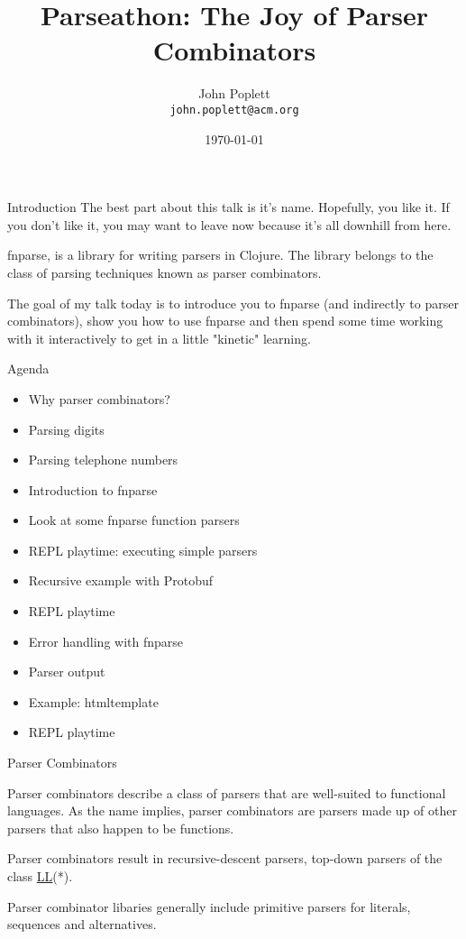 \documentclass[presentation]{beamer}
\begin{document}
\title{Parseathon: The Joy of Parser Combinators}
\author{John Poplett\\
  \texttt{john.poplett@acm.org}}
\date{\today}

\begin{frame}[plain]
\titlepage
\end{frame}

\begin{frame}{Introduction}
 The best part about this talk is it's name. Hopefully, you like it. If
you don't like it, you may want to leave now because it's all downhill
from here.

fnparse, is a library for writing parsers in Clojure. The library
belongs to the class of parsing techniques known as parser combinators.

The goal of my talk today is to introduce you to fnparse (and
indirectly to parser combinators), show you how to use fnparse and
then spend some time working with it interactively to get in a little
"kinetic" learning.
\end{frame}

\begin{frame}{Agenda}

\begin{itemize}
\item Why parser combinators?
\item Parsing digits
\item Parsing telephone numbers
\item Introduction to fnparse
\item Look at some fnparse function parsers
\item REPL playtime: executing simple parsers
\item Recursive example with Protobuf
\item REPL playtime
\item Error handling with fnparse
\item Parser output
\item Example: htmltemplate
\item REPL playtime
\end{itemize}

\end{frame}

\begin{frame}{Parser Combinators}

  Parser combinators describe a class of parsers that are well-suited
  to functional languages. As the name implies, parser combinators are
  parsers made up of other parsers that also happen to be functions.

  Parser combinators result in recursive-descent parsers, top-down
  parsers of the class \href{http://en.wikipedia.org/wiki/LL_parser}{LL}(*).

  Parser combinator libaries generally include primitive parsers for
  literals, sequences and alternatives.

\end{frame}
\end{document}
